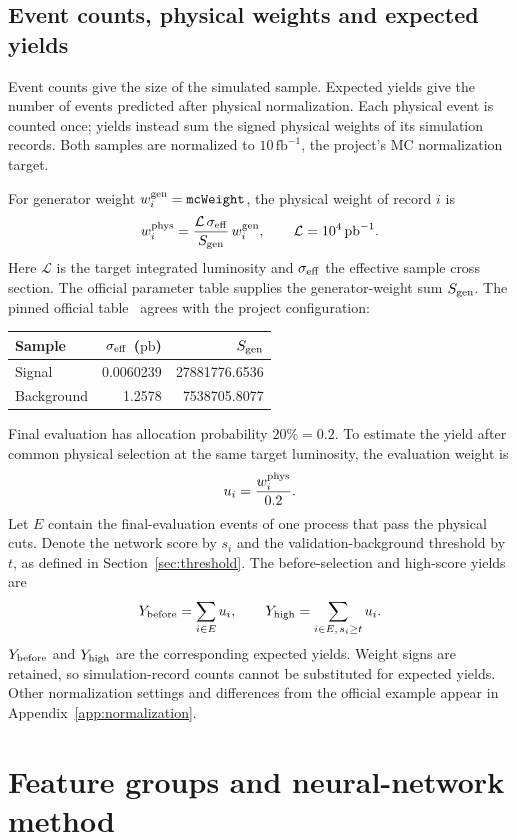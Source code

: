 \documentclass[11pt,a4paper]{article}
\begin{document}
\subsection{Event counts, physical weights and expected yields}\label{sec:weights}
Event counts give the size of the simulated sample. Expected yields give the number of events predicted after physical normalization.
Each physical event is counted once; yields instead sum the signed physical weights of its simulation records.
Both samples are normalized to $10\,\mathrm{fb}^{-1}$, the project's MC normalization target.

For generator weight $w_i^{\rm gen}=\texttt{mcWeight}$, the physical weight of record $i$ is
\[
 w_i^{\rm phys}=\frac{\mathcal L\,\sigma_{\rm eff}}{S_{\rm gen}}\,w_i^{\rm gen},
 \qquad \mathcal L=10^4\,\mathrm{pb}^{-1}.
\]
Here $\mathcal L$ is the target integrated luminosity and $\sigma_{\rm eff}$ the effective sample cross section. The official parameter table supplies the generator-weight sum $S_{\rm gen}$.
The pinned official table~\cite{SampleInfo} agrees with the project configuration:
\begin{center}
\small
\begin{tabular}{lrr}
\toprule
Sample & $\sigma_{\rm eff}$ ($\mathrm{pb}$) & $S_{\rm gen}$ \\
\midrule
Signal & 0.0060239 & 27881776.6536 \\
Background & 1.2578 & 7538705.8077 \\
\bottomrule
\end{tabular}
\end{center}

Final evaluation has allocation probability $20\%=0.2$.
To estimate the yield after common physical selection at the same target luminosity, the evaluation weight is
\[
 u_i=\frac{w_i^{\rm phys}}{0.2}.
\]
Let $E$ contain the final-evaluation events of one process that pass the physical cuts. Denote the network score by $s_i$ and the validation-background threshold by $t$, as defined in Section~\ref{sec:threshold}.
The before-selection and high-score yields are
\[
 Y_{\rm before}=\sum_{i\in E}u_i,\qquad
 Y_{\rm high}=\sum_{i\in E,\,s_i\geq t}u_i.
\]
$Y_{\rm before}$ and $Y_{\rm high}$ are the corresponding expected yields.
Weight signs are retained, so simulation-record counts cannot be substituted for expected yields.
Other normalization settings and differences from the official example appear in Appendix~\ref{app:normalization}.
\FloatBarrier

\section{Feature groups and neural-network method}
\end{document}
